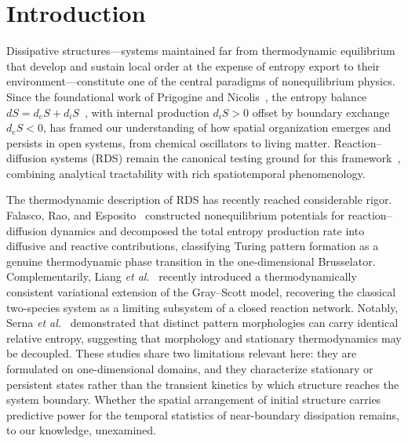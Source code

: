 \documentclass[aps,pre,preprint,superscriptaddress,nofootinbib,floatfix]{revtex4-2}
\begin{document}
\maketitle

\section{Introduction}

Dissipative structures---systems maintained far from thermodynamic equilibrium that develop and sustain local order at the expense of entropy export to their environment---constitute one of the central paradigms of nonequilibrium physics. Since the foundational work of Prigogine and Nicolis~\cite{prigogine1977,nicolis1971}, the entropy balance $dS = d_eS + d_iS$~\cite{degroot1984}, with internal production $d_iS>0$ offset by boundary exchange $d_eS<0$, has framed our understanding of how spatial organization emerges and persists in open systems, from chemical oscillators to living matter. Reaction--diffusion systems (RDS) remain the canonical testing ground for this framework~\cite{cross1993}, combining analytical tractability with rich spatiotemporal phenomenology.

The thermodynamic description of RDS has recently reached considerable rigor. Falasco, Rao, and Esposito~\cite{falasco2018} constructed nonequilibrium potentials for reaction--diffusion dynamics and decomposed the total entropy production rate into diffusive and reactive contributions, classifying Turing pattern formation as a genuine thermodynamic phase transition in the one-dimensional Brusselator. Complementarily, Liang \textit{et al.}~\cite{liang2024} recently introduced a thermodynamically consistent variational extension of the Gray--Scott model, recovering the classical two-species system as a limiting subsystem of a closed reaction network. Notably, Serna \textit{et al.}~\cite{serna2017} demonstrated that distinct pattern morphologies can carry identical relative entropy, suggesting that morphology and stationary thermodynamics may be decoupled. These studies share two limitations relevant here: they are formulated on one-dimensional domains, and they characterize stationary or persistent states rather than the transient kinetics by which structure reaches the system boundary. Whether the spatial arrangement of initial structure carries predictive power for the temporal statistics of near-boundary dissipation remains, to our knowledge, unexamined.
\end{document}
